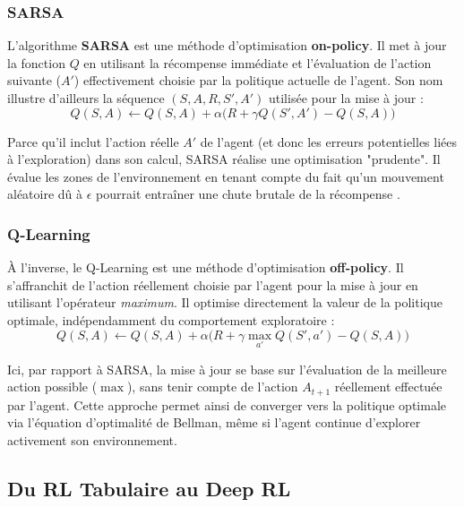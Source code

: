 \subsubsection{SARSA}

L'algorithme \textbf{SARSA} \parencite{suttonReinforcementLearningIntroduction2018} est une méthode d'optimisation \textbf{on-policy}. Il met à jour la fonction $Q$ en utilisant la récompense immédiate et l'évaluation de l'action suivante ($A'$) effectivement choisie par la politique actuelle de l'agent. Son nom illustre d'ailleurs la séquence $(S, A, R, S', A')$ utilisée pour la mise à jour :
\begin{equation}
Q(S,A) \leftarrow Q(S,A) + \alpha \big( R + \gamma Q(S',A') - Q(S,A) \big)
\end{equation}

Parce qu'il inclut l'action réelle $A'$ de l'agent (et donc les erreurs potentielles liées à l'exploration) dans son calcul, SARSA réalise une optimisation "prudente". Il évalue les zones de l'environnement en tenant compte du fait qu'un mouvement aléatoire dû à $\epsilon$ pourrait entraîner une chute brutale de la récompense \parencite{silverLecturesReinforcementLearning2015}.

\subsubsection{Q-Learning}

À l'inverse, le Q-Learning \parencite{watkinsQlearning1992} est une méthode d'optimisation \textbf{off-policy}. Il s'affranchit de l'action réellement choisie par l'agent pour la mise à jour en utilisant l'opérateur \textit{maximum}. Il optimise directement la valeur de la politique optimale, indépendamment du comportement exploratoire :
\begin{equation}
Q(S,A) \leftarrow Q(S,A) + \alpha \big( R + \gamma \max_{a'} Q(S',a') - Q(S,A) \big)
\end{equation}

Ici, par rapport à SARSA, la mise à jour se base sur l'évaluation de la meilleure action possible ($\max$), sans tenir compte de l'action $A_{t+1}$ réellement effectuée par l'agent. Cette approche permet ainsi de converger vers la politique optimale via l'équation d'optimalité de Bellman, même si l'agent continue d'explorer activement son environnement.


\subsection{Du RL Tabulaire au Deep RL}

